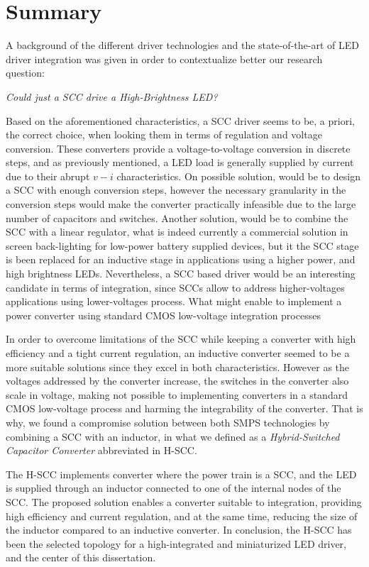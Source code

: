 \section{ Summary}

A background of the different driver technologies and the state-of-the-art of LED driver integration was given in order to contextualize better our research question:

\emph{
\centering 
 Could just a SCC drive a High-Brightness LED?
 }

Based on the aforementioned characteristics, a SCC driver seems to be, a priori, the correct choice, when looking them in terms of regulation and voltage conversion. These converters provide a voltage-to-voltage conversion in discrete steps, and as previously mentioned, a LED load is generally supplied by current due to their abrupt $v-i$ characteristics. On possible solution, would be to design a SCC with enough conversion steps, however the necessary granularity in the conversion steps would make the converter practically infeasible due to the large number of capacitors and switches. Another solution, would be to combine the SCC with a linear regulator, what is indeed currently a commercial solution in screen back-lighting for low-power battery supplied devices, but it the SCC stage is been replaced for an inductive stage in applications using a higher power, and high brightness LEDs. Nevertheless, a SCC based driver would be an interesting candidate in terms of integration, since SCCs allow to address higher-voltages applications using lower-voltages process. What might enable to implement a power converter using standard CMOS low-voltage integration processes
 
In order to overcome limitations of the SCC while keeping a converter with high efficiency and a tight current regulation, an inductive converter seemed to be a more suitable solutions since they excel in both characteristics. However as the voltages addressed by the converter increase, the switches in the converter also scale in voltage, making not possible to implementing converters in a standard CMOS low-voltage process and harming the integrability of the converter. That is why, we found a compromise solution between both SMPS technologies by combining a SCC with an inductor, in what we defined as a \emph{Hybrid-Switched Capacitor Converter} abbreviated in H-SCC. 

The H-SCC implements converter where the power train is a SCC, and the LED is supplied through an inductor connected to one of the internal nodes of the SCC. The proposed solution enables a converter suitable to integration, providing high efficiency and current regulation, and at the same time, reducing the size of the inductor compared to an inductive converter. In conclusion, the H-SCC has been the selected topology for a high-integrated and miniaturized LED driver, and the center of this dissertation.   




 